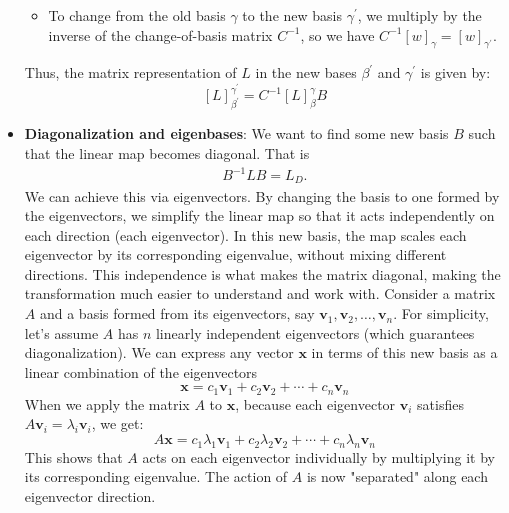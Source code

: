 \documentclass{report}
\begin{document}
\begin{itemize}
\begin{itemize}
                \item To change from the old basis \(\gamma\) to the new basis \(\gamma^{\prime}\), we multiply by the inverse of the change-of-basis matrix \(C^{-1}\), so we have \(C^{-1}[w]_{\gamma} = [w]_{\gamma^{\prime}}\).
            \end{itemize}
            \bigbreak \noindent 
            Thus, the matrix representation of \(L\) in the new bases \(\beta^{\prime}\) and \(\gamma^{\prime}\) is given by:
            \[
                [L]_{\beta^{\prime}}^{\gamma^{\prime}} = C^{-1}[L]_{\beta}^{\gamma}B
            \]
        \item \textbf{Diagonalization and eigenbases}: We want to find some new basis $B$ such that the linear map becomes diagonal. That is
            \begin{align*}
                B^{-1}LB = L_{D}
            .\end{align*}
            \bigbreak \noindent 
            We can achieve this via eigenvectors. By changing the basis to one formed by the eigenvectors, we simplify the linear map so that it acts independently on each direction (each eigenvector). In this new basis, the map scales each eigenvector by its corresponding eigenvalue, without mixing different directions. This independence is what makes the matrix diagonal, making the transformation much easier to understand and work with.
            \bigbreak \noindent 
            Consider a matrix \( A \) and a basis formed from its eigenvectors, say 
            \( \mathbf{v}_1, \mathbf{v}_2, \dots, \mathbf{v}_n \). For simplicity, let’s assume \( A \) has \( n \) linearly 
            independent eigenvectors (which guarantees diagonalization).
            \bigbreak \noindent 
            We can express any vector \( \mathbf{x} \) in terms of this new basis as a linear combination of the eigenvectors
            \[
                \mathbf{x} = c_1 \mathbf{v}_1 + c_2 \mathbf{v}_2 + \cdots + c_n \mathbf{v}_n
            \]
            When we apply the matrix \( A \) to \( \mathbf{x} \), because each eigenvector \( \mathbf{v}_i \) satisfies 
            \( A \mathbf{v}_i = \lambda_i \mathbf{v}_i \), we get:
            \[
                A \mathbf{x} = c_1 \lambda_1 \mathbf{v}_1 + c_2 \lambda_2 \mathbf{v}_2 + \cdots + c_n \lambda_n \mathbf{v}_n
            \]
            This shows that \( A \) acts on each eigenvector individually by multiplying 
            it by its corresponding eigenvalue. The action of \( A \) is now "separated" 
            along each eigenvector direction.
            \bigbreak \noindent 

\end{itemize}
\end{document}

